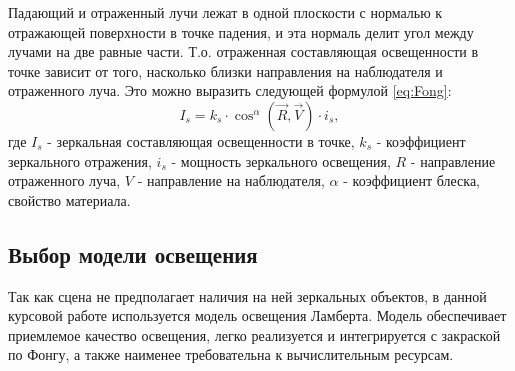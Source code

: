 Падающий и отраженный лучи лежат в одной плоскости с нормалью к отражающей поверхности в точке падения, и эта нормаль делит угол между лучами на две равные части. Т.о. отраженная составляющая освещенности в точке зависит от того, насколько близки направления на наблюдателя и отраженного луча. Это можно выразить следующей формулой \ref{eq:Fong}:
\begin{equation}
    \label{eq:Fong}
    I_s = k_s \cdot \cos^\alpha(\vec{R}, \vec{V}) \cdot i_s,
\end{equation}
где $I_s$ - зеркальная составляющая освещенности в точке, $k_s$ - коэффициент зеркального отражения, $i_s$ - мощность зеркального освещения, $R$ - направление отраженного луча, $V$ - направление на наблюдателя, $\alpha$ - коэффициент блеска, свойство материала.

\subsection{Выбор модели освещения}
Так как сцена не предполагает наличия на ней зеркальных объектов, в данной курсовой работе используется модель освещения Ламберта. Модель обеспечивает приемлемое качество освещения, легко реализуется и интегрируется с закраской по Фонгу, а также наименее требовательна к вычислительным ресурсам.

